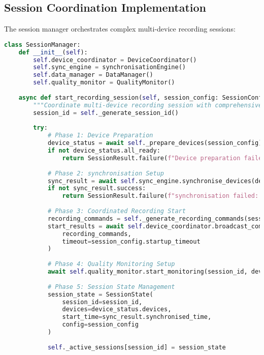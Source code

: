 \documentclass[11pt,a4paper]{report}
\begin{document}
\subsection{Session Coordination Implementation}

The session manager orchestrates complex multi-device recording sessions:

\begin{lstlisting}[language=Python]
class SessionManager:
    def __init__(self):
        self.device_coordinator = DeviceCoordinator()
        self.sync_engine = synchronisationEngine()
        self.data_manager = DataManager()
        self.quality_monitor = QualityMonitor()
        
    async def start_recording_session(self, session_config: SessionConfig) -> SessionResult:
        """Coordinate multi-device recording session with comprehensive error handling."""
        session_id = self._generate_session_id()
        
        try:
            # Phase 1: Device Preparation
            device_status = await self._prepare_devices(session_config)
            if not device_status.all_ready:
                return SessionResult.failure(f"Device preparation failed: {device_status.errors}")
            
            # Phase 2: synchronisation Setup
            sync_result = await self.sync_engine.synchronise_devices(device_status.devices)
            if not sync_result.success:
                return SessionResult.failure(f"synchronisation failed: {sync_result.error}")
            
            # Phase 3: Coordinated Recording Start
            recording_commands = self._generate_recording_commands(session_config)
            start_results = await self.device_coordinator.broadcast_commands(
                recording_commands,
                timeout=session_config.startup_timeout
            )
            
            # Phase 4: Quality Monitoring Setup
            await self.quality_monitor.start_monitoring(session_id, device_status.devices)
            
            # Phase 5: Session State Management
            session_state = SessionState(
                session_id=session_id,
                devices=device_status.devices,
                start_time=sync_result.synchronised_time,
                config=session_config
            )
            
            self._active_sessions[session_id] = session_state
            

\end{lstlisting}
\end{document}
